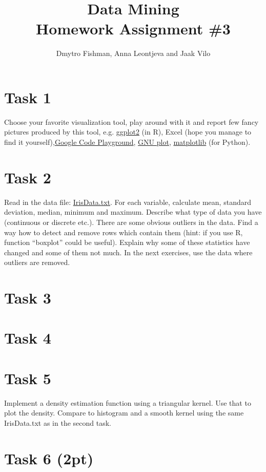 \documentclass{article}
\title{Data Mining\\Homework Assignment \#3} %
\author{Dmytro Fishman, Anna Leontjeva and Jaak Vilo} %
\begin{document}
\maketitle %

\section*{Task 1}
Choose your favorite visualization tool, play around with it and report few fancy pictures produced by this tool, e.g. \href{http://docs.ggplot2.org/current/}{ggplot2} (in R), Excel (hope you manage to find it yourself),\href{https://code.google.com/apis/ajax/playground/?type=visualization#motion_chart}{Google Code Playground}, \href{http://www.gnuplot.info/}{GNU plot}, \href{http://matplotlib.org/}{matplotlib} (for Python).
\section*{Task 2}
 Read in the data file: \href{http://www0.cs.ucl.ac.uk/staff/m.herbster/GI07/week4/iris.data.txt}{IrisData.txt}. For each variable, calculate mean, standard deviation, median, minimum and maximum. Describe what type of data you have (continuous or discrete etc.). There are some obvious outliers in the data. Find a way how to detect and remove rows which contain them (hint: if you use R, function ``boxplot'' could be useful). Explain why some of these statistics have changed and some of them not much. In the next exercises, use the data where outliers are removed.

\section*{Task 3}

\section*{Task 4}
 
\section*{Task 5}
Implement a density estimation function using a triangular kernel. Use that to plot the density. Compare to histogram and a smooth kernel using the same IrisData.txt as in the second task. 

\section*{Task 6 (2pt)}
\end{document}

